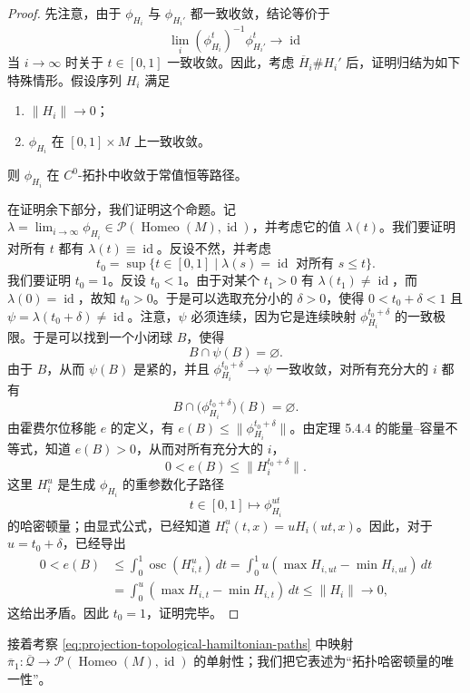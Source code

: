 \begin{proof}
先注意，由于 $\phi_{H_i}$ 与 $\phi_{H_i'}$ 都一致收敛，结论等价于
\[
 \lim_i(\phi_{H_i}^t)^{-1}\phi_{H_i'}^t\longrightarrow
 \operatorname{id}
\]
当 $i\to\infty$ 时关于 $t\in[0,1]$ 一致收敛。因此，考虑
$\overline H_i\#H_i'$ 后，证明归结为如下特殊情形。假设序列
$H_i$ 满足
\begin{enumerate}[label=(\arabic*)]
 \item $\|H_i\|\to0$；
 \item $\phi_{H_i}$ 在 $[0,1]\times M$ 上一致收敛。
\end{enumerate}
则 $\phi_{H_i}$ 在 $C^0$-拓扑中收敛于常值恒等路径。

在证明余下部分，我们证明这个命题。记
$\lambda=\lim_{i\to\infty}\phi_{H_i}\in
\mathcal P(\operatorname{Homeo}(M),\operatorname{id})$，并考虑它的值
$\lambda(t)$。我们要证明对所有 $t$ 都有
$\lambda(t)\equiv\operatorname{id}$。反设不然，并考虑
\[
 t_0=\sup\{t\in[0,1]\mid
 \lambda(s)=\operatorname{id}\text{ 对所有 }s\leq t\}.
\]
我们要证明 $t_0=1$。反设 $t_0<1$。由于对某个
$t_1>0$ 有 $\lambda(t_1)\ne\operatorname{id}$，而
$\lambda(0)=\operatorname{id}$，故知 $t_0>0$。于是可以选取充分小的
$\delta>0$，使得 $0<t_0+\delta<1$ 且
$\psi=\lambda(t_0+\delta)\ne\operatorname{id}$。注意，$\psi$ 必须连续，因为它是连续映射
$\phi_{H_i}^{t_0+\delta}$ 的一致极限。于是可以找到一个小闭球 $B$，使得
\[
 B\cap\psi(B)=\varnothing.
\]
由于 $B$，从而 $\psi(B)$ 是紧的，并且
$\phi_{H_i}^{t_0+\delta}\to\psi$ 一致收敛，对所有充分大的 $i$ 都有
\[
 B\cap\bigl(\phi_{H_i}^{t_0+\delta}\bigr)(B)=\varnothing.
\]
由霍费尔位移能 $e$ 的定义，有
$e(B)\leq\|\phi_{H_i}^{t_0+\delta}\|$。由定理 5.4.4 的能量--容量不等式，知道
$e(B)>0$，从而对所有充分大的 $i$，
\[
 0<e(B)\leq\|H_i^{t_0+\delta}\|.
\]
这里 $H_i^u$ 是生成 $\phi_{H_i}$ 的重参数化子路径
\[
 t\in[0,1]\longmapsto\phi_{H_i}^{ut}
\]
的哈密顿量；由显式公式，已经知道
$H_i^u(t,x)=uH_i(ut,x)$。因此，对于 $u=t_0+\delta$，已经导出
\[
\begin{aligned}
 0<e(B)
 &\leq\int_0^1\operatorname{osc}(H_{i,t}^u)\,dt
 =\int_0^1u(\max H_{i,ut}-\min H_{i,ut})\,dt\\
 &=\int_0^u(\max H_{i,t}-\min H_{i,t})\,dt
 \leq\|H_i\|\longrightarrow0,
\end{aligned}
\]
这给出矛盾。因此 $t_0=1$，证明完毕。
\end{proof}

接着考察 \eqref{eq:projection-topological-hamiltonian-paths} 中映射
$\overline\pi_1:\overline{\mathcal Q}\to
\mathcal P(\operatorname{Homeo}(M),\operatorname{id})$ 的单射性；我们把它表述为“拓扑哈密顿量的唯一性”。

